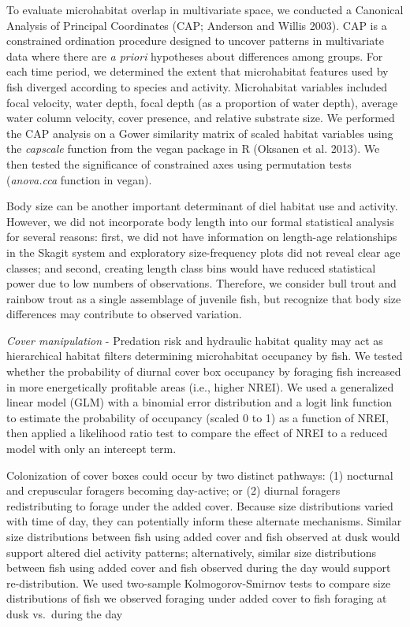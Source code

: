 \documentclass[]{article}
\begin{document}
To evaluate microhabitat overlap in multivariate space, we conducted a
Canonical Analysis of Principal Coordinates (CAP; Anderson and Willis
2003). CAP is a constrained ordination procedure designed to uncover
patterns in multivariate data where there are \emph{a priori} hypotheses
about differences among groups. For each time period, we determined the
extent that microhabitat features used by fish diverged according to
species and activity. Microhabitat variables included focal velocity,
water depth, focal depth (as a proportion of water depth), average water
column velocity, cover presence, and relative substrate size. We
performed the CAP analysis on a Gower similarity matrix of scaled
habitat variables using the \emph{capscale} function from the vegan
package in R (Oksanen et al. 2013). We then tested the significance of
constrained axes using permutation tests (\emph{anova.cca} function in
vegan).

Body size can be another important determinant of diel habitat use and
activity. However, we did not incorporate body length into our formal
statistical analysis for several reasons: first, we did not have
information on length-age relationships in the Skagit system and
exploratory size-frequency plots did not reveal clear age classes; and
second, creating length class bins would have reduced statistical power
due to low numbers of observations. Therefore, we consider bull trout
and rainbow trout as a single assemblage of juvenile fish, but recognize
that body size differences may contribute to observed variation.

\emph{Cover manipulation} - Predation risk and hydraulic habitat quality
may act as hierarchical habitat filters determining microhabitat
occupancy by fish. We tested whether the probability of diurnal cover
box occupancy by foraging fish increased in more energetically
profitable areas (i.e., higher NREI). We used a generalized linear model
(GLM) with a binomial error distribution and a logit link function to
estimate the probability of occupancy (scaled 0 to 1) as a function of
NREI, then applied a likelihood ratio test to compare the effect of NREI
to a reduced model with only an intercept term.

Colonization of cover boxes could occur by two distinct pathways: (1)
nocturnal and crepuscular foragers becoming day-active; or (2) diurnal
foragers redistributing to forage under the added cover. Because size
distributions varied with time of day, they can potentially inform these
alternate mechanisms. Similar size distributions between fish using
added cover and fish observed at dusk would support altered diel
activity patterns; alternatively, similar size distributions between
fish using added cover and fish observed during the day would support
re-distribution. We used two-sample Kolmogorov-Smirnov tests to compare
size distributions of fish we observed foraging under added cover to
fish foraging at dusk vs.~during the day
\end{document}
